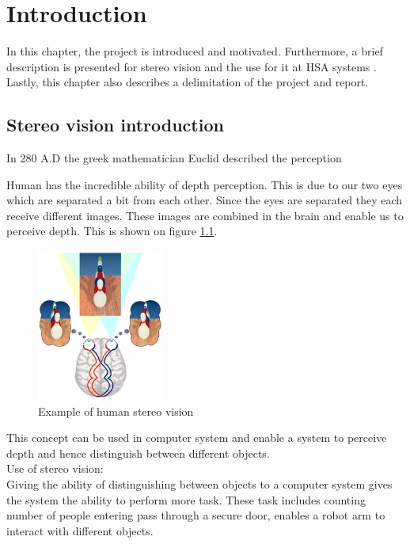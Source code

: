 \chapter{Introduction}\label{ch:introduction}
In this chapter, the project is introduced and motivated. Furthermore, a brief description is presented for stereo vision and the use for it at HSA systems . Lastly, this chapter also describes a delimitation of the project and report.\\

\section{Stereo vision introduction}
In 280 A.D the greek mathematician Euclid described the perception  \cite{lit:historyofstereophoto}

Human has the incredible ability of depth perception. This is due to our two eyes which are separated a bit from each other. Since the eyes are separated they each receive different images. These images are combined in the brain and enable us to perceive depth. This is shown on figure \ref{fig:humanviscones}. 

\begin{figure}
  \centering
  \includegraphics[height=5cm]{figures/stereovisionhuman}
  \caption{Example of human stereo vision \cite{lit:Stereovision3d}}
  \label{fig:humanviscones}
\end{figure}

This concept can be used in computer system and enable a system to perceive depth and hence distinguish between different objects.\\

Use of stereo vision:\\
Giving the ability of distinguishing between objects to a computer system gives the system the ability to perform more task. These task includes counting number of people entering pass through a secure door, enables a robot arm to interact with different objects.\\

